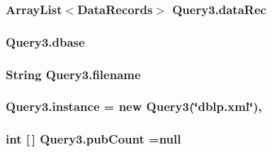 \subsubsection[{\texorpdfstring{data\+Rec}{dataRec}}]{\setlength{\rightskip}{0pt plus 5cm}Array\+List$<${\bf Data\+Records}$>$ Query3.\+data\+Rec\hspace{0.3cm}{\ttfamily [private]}}\hypertarget{classQuery3_af5c1e99f9d5402273b0a993aa965a6d2}{}\label{classQuery3_af5c1e99f9d5402273b0a993aa965a6d2}
\subsubsection[{\texorpdfstring{dbase}{dbase}}]{ Query3.\+dbase\hspace{0.3cm}{\ttfamily [private]}}\hypertarget{classQuery3_acf21ca7cef4efec2a30d041d8b0770f1}{}\label{classQuery3_acf21ca7cef4efec2a30d041d8b0770f1}
\subsubsection[{\texorpdfstring{filename}{filename}}]{\setlength{\rightskip}{0pt plus 5cm}String Query3.\+filename\hspace{0.3cm}{\ttfamily [private]}}\hypertarget{classQuery3_a53f8993bc386e315c22cace0c0405336}{}\label{classQuery3_a53f8993bc386e315c22cace0c0405336}
\subsubsection[{\texorpdfstring{instance}{instance}}]{ Query3.\+instance = new {\bf Query3}(\char`\"{}dblp.\+xml\char`\"{})\hspace{0.3cm}{\ttfamily [static]}, {\ttfamily [private]}}\hypertarget{classQuery3_a21e9b649c7b92dcd18831c6a1471454a}{}\label{classQuery3_a21e9b649c7b92dcd18831c6a1471454a}
\subsubsection[{\texorpdfstring{pub\+Count}{pubCount}}]{\setlength{\rightskip}{0pt plus 5cm}int \mbox{[}$\,$\mbox{]} Query3.\+pub\+Count =null\hspace{0.3cm}{\ttfamily [private]}}\hypertarget{classQuery3_af016450dd2c9582f3ef5b2979969d201}{}\label{classQuery3_af016450dd2c9582f3ef5b2979969d201}
